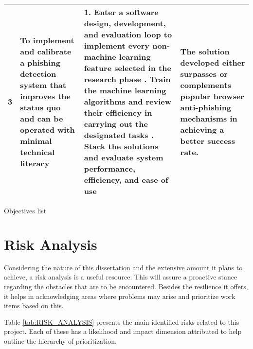 \begin{landscape}
\begin{singlespace}
\begin{center}
\begin{tabular}{ | m{0.5em} | m{18.5em} | m{23em}| m{16em} | }
				\hline
				\textbf{3}  &
				To implement and calibrate a phishing detection system that
				improves the status quo and can be operated with minimal
				technical literacy
				            &
				1. Enter a software design, development, and evaluation loop to
				implement every non-machine learning feature selected in the
				research phase
				\newline\newline
				2. Train the machine learning algorithms and review their
				efficiency in carrying out the designated tasks
				\newline\newline
				3. Stack the solutions and evaluate system performance,
				efficiency, and ease of use
				            &
				The solution developed either surpasses or complements popular
				browser anti-phishing mechanisms in achieving a better success
				rate.                                                           \\

				\hline
			\end{tabular}
			\captionsetup{type=table}\caption{Objectives list}
		\end{center}
	\end{singlespace}
\end{landscape}
\section{Risk Analysis}

Considering the nature of this dissertation and the extensive amount it
plans to achieve, a risk analysis is a useful resource. This will assure a
proactive stance regarding the obstacles that are to be encountered. Besides the
resilience it offers, it helps in acknowledging areas where problems may arise
and prioritize work items based on this.

Table \ref{tab:RISK_ANALYSIS} presents the main identified risks related to
this project. Each of these has a likelihood and impact dimension attributed to
help outline the hierarchy of prioritization.

